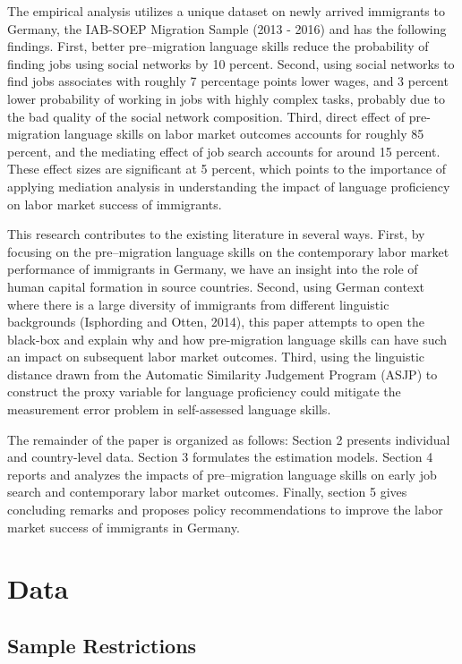\documentclass[12pt,a4paper]{article}
\begin{document}
The empirical analysis utilizes a unique dataset on newly arrived immigrants to Germany, the IAB-SOEP Migration Sample (2013 - 2016) and has the following findings. First, better pre--migration language skills reduce the probability of finding jobs using social networks by 10 percent. Second, using social networks to find jobs associates with roughly 7 percentage points lower wages, and 3 percent lower probability of working in jobs with highly complex tasks, probably due to the bad quality of the social network composition. Third, direct effect of pre-migration language skills on labor market outcomes accounts for roughly 85 percent, and the mediating effect of job search accounts for around 15 percent. These effect sizes are significant at 5 percent, which points to the importance of applying mediation analysis in understanding the impact of language proficiency on labor market success of immigrants.

This research contributes to the existing literature in several ways. First, by focusing on the pre--migration language skills on the contemporary labor market performance of immigrants in Germany, we have an insight into the role of human capital formation in source countries. Second, using German context where there is a large diversity of immigrants from different linguistic backgrounds (Isphording and Otten, 2014), this paper attempts to open the black-box and explain why and how pre-migration language skills can have such an impact on subsequent labor market outcomes. Third, using the linguistic distance drawn from the Automatic Similarity Judgement Program (ASJP) to construct the proxy variable for language proficiency could mitigate the measurement error problem in self-assessed language skills.

The remainder of the paper is organized as follows: Section 2 presents individual and country-level data. Section 3 formulates the estimation models. Section 4 reports and analyzes the impacts of pre--migration language skills on early job search and contemporary labor market outcomes. Finally, section 5 gives concluding remarks and proposes policy recommendations to improve the labor market success of immigrants in Germany.

\section{Data}
\subsection{Sample Restrictions}
\end{document}
